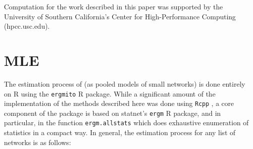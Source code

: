 \documentclass[12pt]{article}
\begin{document}
Computation for the work described in this paper was supported by the University of Southern California’s Center for High-Performance Computing (hpcc.usc.edu).

\clearpage


\nocite{vegayon2019,R,butts2016,Wickham2016,Leifeld2013}


\clearpage

\appendix

\section{MLE\label{appendix:mle}}

The estimation process of \ergmitos{} (as pooled models of small networks) is done entirely on R using the \texttt{ergmito} R package. While a significant amount of the implementation of the methods described here was done using \texttt{Rcpp} \cite{Eddelbuettel2011}, a core component of the package is based on statnet's \texttt{ergm} R package, and in particular, in the function \texttt{ergm.allstats} which does exhaustive enumeration of statistics in a compact way. In general, the estimation process for any list of networks is as follows:
\end{document}
